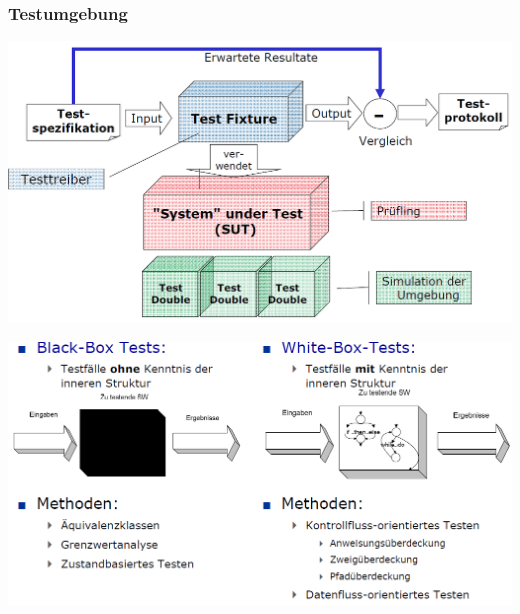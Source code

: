 \subsubsection{Testumgebung}
\begin{minipage}{0.5\linewidth}
\includegraphics[width=\linewidth]{images/testumgebung}
\end{minipage}
\begin{minipage}{0.5\linewidth}
	\includegraphics[width=\linewidth]{images/blackwhitetests}
\end{minipage}
